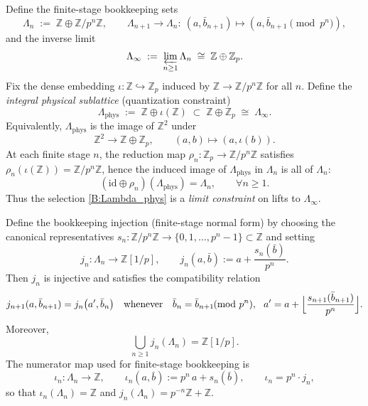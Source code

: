 \documentclass[11pt]{article}
\theoremstyle{remark}
\begin{document}
Define the finite-stage bookkeeping sets
\begin{equation}
\Lambda_{n}\;:=\;\mathbb{Z}\oplus \mathbb{Z}/p^{n}\mathbb{Z},
\qquad
\Lambda_{n+1}\to\Lambda_{n}:\ (a,\bar b_{n+1})\mapsto (a,\bar b_{n+1}\!\!\!\pmod{p^{n}}),
\label{B:Lambda_n}
\end{equation}
and the inverse limit
\begin{equation}
\Lambda_{\infty}
\;:=\;
\varprojlim_{n\ge 1}\Lambda_{n}
\;\cong\;
\mathbb{Z}\oplus \mathbb{Z}_{p}.
\label{B:Lambdainfty}
\end{equation}
Fix the dense embedding $\iota:\mathbb{Z}\hookrightarrow\mathbb{Z}_{p}$ induced by $\mathbb{Z}\to \mathbb{Z}/p^{n}\mathbb{Z}$ for all $n$.
Define the \emph{integral physical sublattice} (quantization constraint)
\begin{equation}
\Lambda_{\mathrm{phys}}
\;:=\;
\mathbb{Z}\oplus \iota(\mathbb{Z})
\;\subset\;
\mathbb{Z}\oplus \mathbb{Z}_{p}\;\cong\;\Lambda_{\infty}.
\label{B:Lambda_phys}
\end{equation}
Equivalently, $\Lambda_{\mathrm{phys}}$ is the image of $\mathbb{Z}^{2}$ under
\begin{equation}
\mathbb{Z}^{2}\longrightarrow \mathbb{Z}\oplus\mathbb{Z}_{p},\qquad (a,b)\longmapsto (a,\iota(b)).
\label{B:Z2embed}
\end{equation}
At each finite stage $n$, the reduction map $\rho_n:\mathbb{Z}_{p}\to \mathbb{Z}/p^{n}\mathbb{Z}$ satisfies $\rho_n(\iota(\mathbb{Z}))=\mathbb{Z}/p^{n}\mathbb{Z}$, hence the induced image of $\Lambda_{\mathrm{phys}}$ in $\Lambda_n$ is all of $\Lambda_n$:
\begin{equation}
(\mathrm{id}\oplus\rho_n)(\Lambda_{\mathrm{phys}})=\Lambda_n,\qquad \forall n\ge 1.
\label{B:finite_stage_surj}
\end{equation}
Thus the selection \eqref{B:Lambda_phys} is a \emph{limit constraint} on lifts to $\Lambda_\infty$.

Define the bookkeeping injection (finite-stage normal form) by choosing the canonical representatives
$s_n:\mathbb{Z}/p^n\mathbb{Z}\to\{0,1,\dots,p^n-1\}\subset\mathbb{Z}$ and setting
\begin{equation}
j_n:\Lambda_n\to \mathbb{Z}[1/p],\qquad
j_n(a,\bar b):=a+\frac{s_n(\bar b)}{p^{n}}.
\label{B:jn}
\end{equation}
Then $j_n$ is injective and satisfies the compatibility relation
\begin{equation}
j_{n+1}(a,\bar b_{n+1})=j_n\bigl(a',\bar b_n\bigr)
\quad\text{whenever}\quad
\bar b_n=\bar b_{n+1}\!\!\!\pmod{p^n},\ \ a'=a+\Bigl\lfloor \frac{s_{n+1}(\bar b_{n+1})}{p^n}\Bigr\rfloor.
\label{B:jncompat}
\end{equation}
Moreover,
\begin{equation}
\bigcup_{n\ge 1} j_n(\Lambda_n)=\mathbb{Z}[1/p].
\label{B:unionZloc}
\end{equation}
The numerator map used for finite-stage bookkeeping is
\begin{equation}
\iota_n:\Lambda_n\to\mathbb{Z},\qquad
\iota_n(a,\bar b):=p^{n}\,a+s_n(\bar b),
\qquad
\iota_n=p^{n}\cdot j_n,
\label{B:iota_n}
\end{equation}
so that $\iota_n(\Lambda_n)=\mathbb{Z}$ and $j_n(\Lambda_n)=p^{-n}\mathbb{Z}+\mathbb{Z}$.
\end{document}
